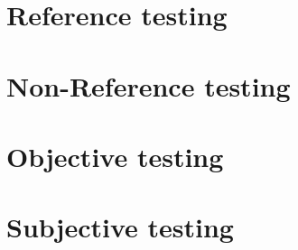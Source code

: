 
\section{Reference testing}
\section{Non-Reference testing}
\section{Objective testing}
\section{Subjective testing}


